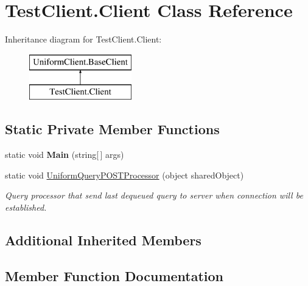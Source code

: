 \hypertarget{class_test_client_1_1_client}{}\section{Test\+Client.\+Client Class Reference}
\label{class_test_client_1_1_client}
Inheritance diagram for Test\+Client.\+Client\+:\begin{figure}[H]
\begin{center}
\leavevmode
\includegraphics[height=2.000000cm]{d6/dac/class_test_client_1_1_client}
\end{center}
\end{figure}
\subsection*{Static Private Member Functions}
\begin{DoxyCompactItemize}
\item 
\mbox{\label{class_test_client_1_1_client_a236c6c2776f2ec6851c36a8714ef6e03}} 
static void {\bfseries Main} (string\mbox{[}$\,$\mbox{]} args)
\item 
static void \mbox{\hyperlink{class_test_client_1_1_client_adae80a1bd43e9e383c52ebb6390f2507}{Uniform\+Query\+P\+O\+S\+T\+Processor}} (object shared\+Object)
\begin{DoxyCompactList}\small\item\em Query processor that send last dequeued query to server when connection will be established. \end{DoxyCompactList}\end{DoxyCompactItemize}
\subsection*{Additional Inherited Members}


\subsection{Member Function Documentation}
\mbox{\label{class_test_client_1_1_client_adae80a1bd43e9e383c52ebb6390f2507}} 
